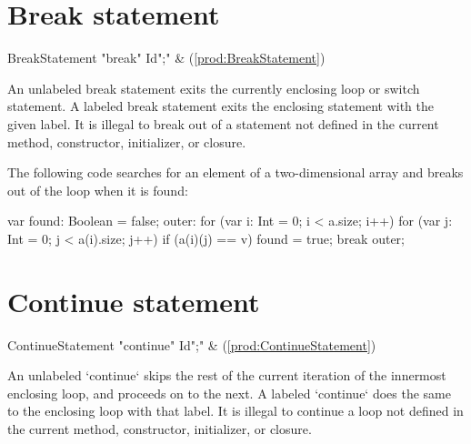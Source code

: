 
\section{Break statement}

\begin{bbgrammar}
      BreakStatement \: \xcd"break" Id\opt \xcd";" & (\ref{prod:BreakStatement}) \\
\end{bbgrammar}


An unlabeled break statement exits the currently enclosing loop or switch
statement. A labeled break statement exits the enclosing 
statement with the given label.
It is illegal to break out of a statement not defined in the current
method, constructor, initializer, or closure.  

\begin{ex}
The following code searches for an element of a two-dimensional
array and breaks out of the loop when it is found:
\begin{xten}
var found: Boolean = false;
outer: for (var i: Int = 0; i < a.size; i++)
    for (var j: Int = 0; j < a(i).size; j++)
        if (a(i)(j) == v) {
            found = true;
            break outer;
        }
\end{xten}
\end{ex}

\section{Continue statement}

\begin{bbgrammar}
   ContinueStatement \: \xcd"continue" Id\opt \xcd";" & (\ref{prod:ContinueStatement}) \\
\end{bbgrammar}
An unlabeled \xcd`continue` skips the rest of the current iteration of the
innermost enclosing loop, and proceeds on to the next.  A labeled
\xcd`continue` does the same to the enclosing loop with that label.
It is illegal to continue a loop not defined in the current
method, constructor, initializer, or closure.



